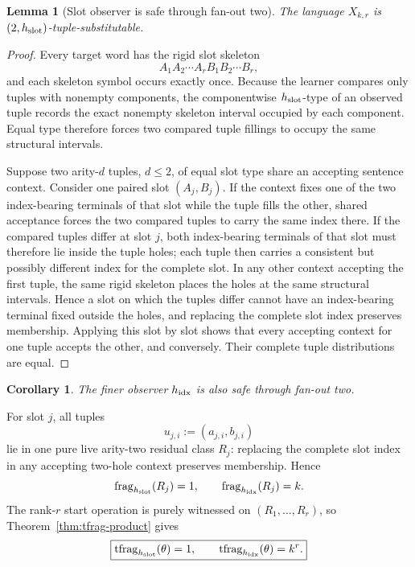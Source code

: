 \documentclass[11pt]{article}
\newtheorem{lemma}[definition]{Lemma}
\newtheorem{corollary}[definition]{Corollary}
\newcommand{\frag}{\operatorname{frag}}
\newcommand{\tfrag}{\operatorname{tfrag}}
\begin{document}
\begin{lemma}[Slot observer is safe through fan-out two]
\label{lem:slot-safe}
The language $X_{k,r}$ is $(2,h_{\rm slot})$-tuple-substitutable.
\end{lemma}

\begin{proof}
Every target word has the rigid slot skeleton
\[
 A_1A_2\cdots A_rB_1B_2\cdots B_r,
\]
and each skeleton symbol occurs exactly once.  Because the learner compares
only tuples with nonempty components, the componentwise
$h_{\rm slot}$-type of an observed tuple records the exact nonempty skeleton
interval occupied by each component.  Equal type therefore forces two
compared tuple fillings to occupy the same structural intervals.

Suppose two arity-$d$ tuples, $d\le2$, of equal slot type share an accepting
sentence context.  Consider one paired slot $(A_j,B_j)$.  If the context fixes
one of the two index-bearing terminals of that slot while the tuple fills the
other, shared acceptance forces the two compared tuples to carry the same
index there.  If the compared tuples differ at slot $j$, both index-bearing
terminals of that slot must therefore lie inside the tuple holes; each tuple
then carries a consistent but possibly different index for the complete slot.
In any other context accepting the first tuple, the same rigid skeleton places
the holes at the same structural intervals.  Hence a slot on which the tuples
differ cannot have an index-bearing terminal fixed outside the holes, and
replacing the complete slot index preserves membership.  Applying this slot by
slot shows that every accepting context for one tuple accepts the other, and
conversely.  Their complete tuple distributions are equal.
\end{proof}

\begin{corollary}
The finer observer $h_{\rm idx}$ is also safe through fan-out two.
\end{corollary}

For slot $j$, all tuples
\[
  u_{j,i}:=(a_{j,i},b_{j,i})
\]
lie in one pure live arity-two residual class $R_j$: replacing the complete
slot index in any accepting two-hole context preserves membership.  Hence
\[
  \frag_{h_{\rm slot}}(R_j)=1,
  \qquad
  \frag_{h_{\rm idx}}(R_j)=k.
\]
The rank-$r$ start operation is purely witnessed on
$(R_1,\ldots,R_r)$, so Theorem~\ref{thm:tfrag-product} gives
\[
  \boxed{
  \tfrag_{h_{\rm slot}}(\theta)=1,
  \qquad
  \tfrag_{h_{\rm idx}}(\theta)=k^r.
  }
\]
\end{document}
